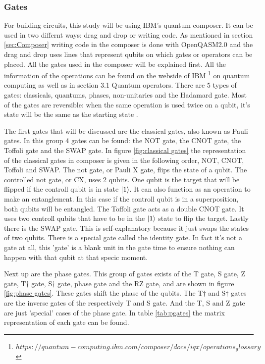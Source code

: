 \subsubsection{Gates}
\label{subsubsec:gates}
For building circuits, this study will be using IBM's quantum composer. It can be used in two differnt ways: drag and drop or writing code.
As mentioned in section \ref{sec:Composer} writing code in the composer is done with OpenQASM2.0 and the drag and drop uses lines that represent qubits on which gates or operators can be placed.
All the gates used in the composer will be explained first. All the information of the operations can be found on the webside of IBM \footnote{$https://quantum-computing.ibm.com/composer/docs/iqx/operations_glossary$} on quantum computing as well as in \textcite{Hidary_2019} section 3.1 Quantum operators.
There are 5 types of gates: classicals, quantums, phases, non-unitaries and the Hadamard gate. Most of the gates are reversible: when the same operation is used twice on a qubit, it's state will be the same as the starting state \autocite{reversible_gates, revgates}.

The first gates that will be discussed are the classical gates, also known as Pauli gates. In this group 4 gates can be found: the NOT gate, the CNOT gate, the Toffoli gate and the SWAP gate.
In figure \ref{fig:classical gates} the representation of the classical gates in composer is given in the following order, NOT, CNOT, Toffoli and SWAP.
The not gate, or Pauli X gate, flips the state of a qubit. The controlled not gate, or CX, uses 2 qubits. One qubit is the target that will be flipped if the controll qubit is in state $\ket{1}$. It can also function as an operation to make an entanglement.
In this case if the controll qubit is in a superposition, both qubits will be entangled. The Toffoli gate acts as a double CNOT gate. It uses two controll qubits that have to be in the $\ket{1}$ state to flip the target.
Lastly there is the SWAP gate. This is self-explanatory because it just swaps the states of two qubits. There is a special gate called the identity gate. In fact it's not a gate at all, this 'gate' is a blank unit in the gate time to ensure nothing can happen with that qubit at that specic moment.

Next up are the phase gates. This group of gates exists of the T gate, S gate, Z gate, T$\dagger$ gate, S$\dagger$ gate, phase gate and the RZ gate, and are shown in figure \ref{fig:phase gates}. These gates shift the phase of the qubits.
The T$\dagger$ and S$\dagger$ gates are the inverse gates of the respectively T and S gate. And the T, S and Z gate are just 'special' cases of the phase gate.
In table \ref{tab:pgates} the matrix representation of each gate can be found.

